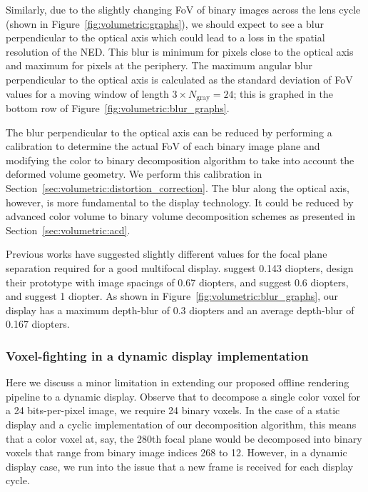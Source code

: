 Similarly, due to the slightly changing FoV of binary images across the lens cycle (shown in Figure~\ref{fig:volumetric:graphs}), we should expect to see a blur perpendicular to the optical axis which could lead to a loss in the spatial resolution of the NED. This blur is minimum for pixels close to the optical axis and maximum for pixels at the periphery. The maximum angular blur perpendicular to the optical axis is calculated as the standard deviation of FoV values for a moving window of length $3 \times N_{\text{gray}}=24$; this is graphed in the bottom row of Figure~\ref{fig:volumetric:blur_graphs}.

The blur perpendicular to the optical axis can be reduced by performing a calibration to determine the actual FoV of each binary image plane and modifying the color to binary decomposition algorithm to take into account the deformed volume geometry. We perform this calibration in Section~\ref{sec:volumetric:distortion_correction}. The blur along the optical axis, however, is more fundamental to the display technology. It could be reduced by advanced color volume to binary volume decomposition schemes as presented in Section~\ref{sec:volumetric:acd}. 

Previous works have suggested slightly different values for the focal plane separation required for a good multifocal display. \citet{Rolland1999dynamic} suggest 0.143 diopters, \citet{Akeley2004} design their prototype with image spacings of 0.67 diopters, \citet{Liu2010systematic} and \citet{Watt2012Real} suggest 0.6 diopters, and \citet{MacKenzie2010Accommodation} suggest 1 diopter. As shown in Figure~\ref{fig:volumetric:blur_graphs}, our display has a maximum depth-blur of 0.3 diopters and an average depth-blur of 0.167 diopters. 

\subsubsection{Voxel-fighting in a dynamic display implementation}
Here we discuss a minor limitation in extending our proposed offline rendering pipeline to a dynamic display. Observe that to decompose a single color voxel for a 24 bits-per-pixel image, we require 24 binary voxels. In the case of a static display and a cyclic implementation of our decomposition algorithm, this means that a color voxel at, say, the 280th focal plane would be decomposed into binary voxels that range from binary image indices 268 to 12. However, in a dynamic display case, we run into the issue that a new frame is received for each display cycle. 

